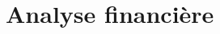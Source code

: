 \documentclass[12pt,a4paper]{report}
\begin{document}
\chapter{Analyse financière}

%
%
%
%
%
%
\end{document}
